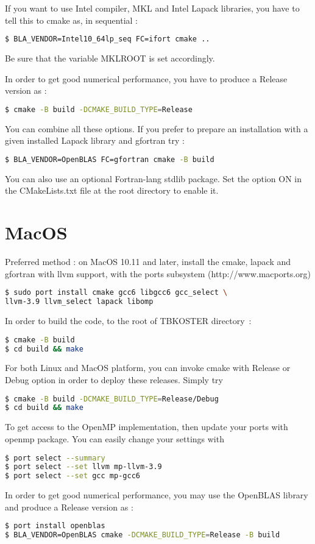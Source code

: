 \documentclass[12pt, onecolumn]{memoir}
\begin{document}
If you want to use Intel compiler, MKL and Intel Lapack libraries, you have to tell this to cmake as, in sequential :
\begin{lstlisting}[language=sh,basicstyle=\small]
$ BLA_VENDOR=Intel10_64lp_seq FC=ifort cmake ..
\end{lstlisting}
Be sure that the variable MKLROOT is set accordingly.

In order to get good numerical performance, you have to produce a Release version as :
\begin{lstlisting}[language=sh,basicstyle=\small]
$ cmake -B build -DCMAKE_BUILD_TYPE=Release
\end{lstlisting}
You can combine all these options.
If you prefer to prepare an installation with a given installed Lapack library and gfortran try :
\begin{lstlisting}[language=sh,basicstyle=\small]
$ BLA_VENDOR=OpenBLAS FC=gfortran cmake -B build
\end{lstlisting}
You can also use an optional Fortran-lang stdlib package.
Set the option ON in the CMakeLists.txt file at the root directory to enable it. 
\section{MacOS}
Preferred method : on MacOS 10.11 and later, install the cmake, lapack and gfortran with llvm support, with the ports subsystem (http://www.macports.org)
\begin{lstlisting}[language=sh,basicstyle=\small]
$ sudo port install cmake gcc6 libgcc6 gcc_select \
llvm-3.9 llvm_select lapack libomp
\end{lstlisting}
In order to build the code, to the root of TBKOSTER directory~:
\begin{lstlisting}[language=sh,basicstyle=\small]
$ cmake -B build
$ cd build && make
\end{lstlisting}
For both Linux and MacOS platform, you can invoke cmake with Release or Debug option in order to deploy these releases. Simply try
\begin{lstlisting}[language=sh,basicstyle=\small]
$ cmake -B build -DCMAKE_BUILD_TYPE=Release/Debug
$ cd build && make
\end{lstlisting}
To get access to the OpenMP implementation, then update your ports with openmp package. You can easily change your settings with
\begin{lstlisting}[language=sh,basicstyle=\small]
$ port select --summary
$ port select --set llvm mp-llvm-3.9
$ port select --set gcc mp-gcc6
\end{lstlisting}
In order to get good numerical performance, you may use the OpenBLAS library and produce a Release version as :
\begin{lstlisting}[language=sh,basicstyle=\small]
$ port install openblas
$ BLA_VENDOR=OpenBLAS cmake -DCMAKE_BUILD_TYPE=Release -B build
\end{lstlisting}
\end{document}
